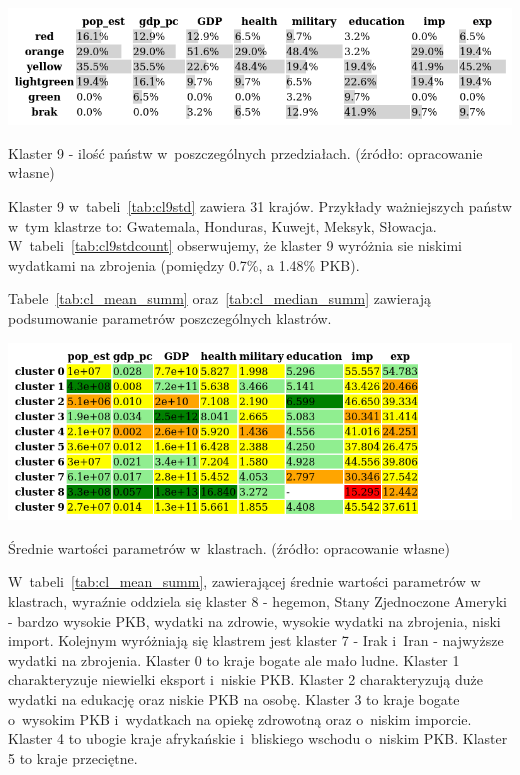 \documentclass[11pt]{report}
\begin{document}
    \begin{table}[!htp]
        \centering
        \includegraphics[width=\linewidth]{tables/CLUST/cluster9stdkmeanscount.png}
        \caption{Klaster 9 - ilość państw w~poszczególnych przedziałach. (źródło: opracowanie własne)}
        \label{tab:cl9stdcount}
    \end{table}

    Klaster 9 w~tabeli~\ref{tab:cl9std} zawiera 31 krajów.
    Przykłady ważniejszych państw w~tym klastrze to: Gwatemala, Honduras, Kuwejt, Meksyk, Słowacja.
    W~tabeli~\ref{tab:cl9stdcount} obserwujemy, że klaster 9 wyróżnia sie niskimi wydatkami na zbrojenia (pomiędzy 0.7\%, a 1.48\% PKB).

    Tabele~\ref{tab:cl_mean_summ} oraz~\ref{tab:cl_median_summ} zawierają podsumowanie parametrów poszczególnych klastrów.

    \begin{table}[!htp]
        \centering
        \includegraphics[width=\linewidth]{tables/CLUST/desc/cluster_mean_summary.png}
        \caption{Średnie wartości parametrów w~klastrach. (źródło: opracowanie własne)}
        \label{tab:cl_mean_summ}
    \end{table}

    W~tabeli~\ref{tab:cl_mean_summ}, zawierającej średnie wartości parametrów w klastrach, wyraźnie oddziela się klaster 8 - hegemon, Stany Zjednoczone Ameryki - bardzo wysokie PKB, wydatki na zdrowie, wysokie wydatki na zbrojenia, niski import.
    Kolejnym wyróżniają się klastrem jest klaster 7 - Irak i~Iran - najwyższe wydatki na zbrojenia.
    Klaster 0 to kraje bogate ale mało ludne.
    Klaster 1 charakteryzuje niewielki eksport i~niskie PKB.
    Klaster 2 charakteryzują duże wydatki na edukację oraz niskie PKB na osobę.
    Klaster 3 to kraje bogate o~wysokim PKB i~wydatkach na opiekę zdrowotną oraz o~niskim imporcie.
    Klaster 4 to ubogie kraje afrykańskie i~bliskiego wschodu o~niskim PKB.
    Klaster 5 to kraje przeciętne.
\end{document}
